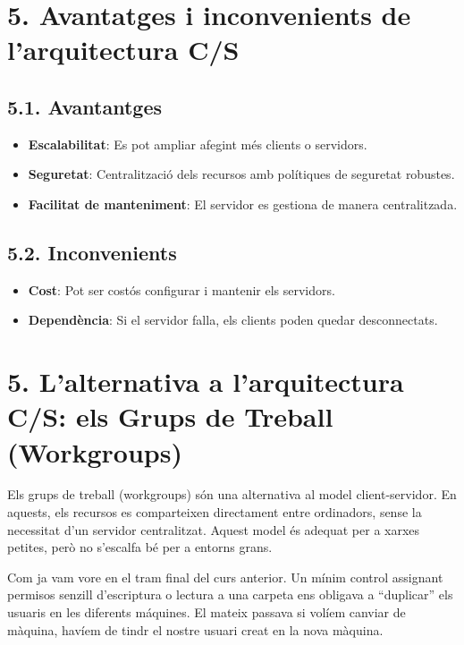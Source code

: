 \documentclass[
  a4paper,
]{article}
\providecommand{\tightlist}{%
  \setlength{\itemsep}{0pt}\setlength{\parskip}{0pt}}
\begin{document}
\section{5. Avantatges i inconvenients de l'arquitectura
C/S}\label{avantatges-i-inconvenients-de-larquitectura-cs}

\subsection{5.1. Avantantges}\label{avantantges}

\begin{itemize}
\tightlist
\item
  \textbf{Escalabilitat}: Es pot ampliar afegint més clients o
  servidors.
\item
  \textbf{Seguretat}: Centralització dels recursos amb polítiques de
  seguretat robustes.
\item
  \textbf{Facilitat de manteniment}: El servidor es gestiona de manera
  centralitzada.
\end{itemize}

\subsection{5.2. Inconvenients}\label{inconvenients}

\begin{itemize}
\tightlist
\item
  \textbf{Cost}: Pot ser costós configurar i mantenir els servidors.
\item
  \textbf{Dependència}: Si el servidor falla, els clients poden quedar
  desconnectats.
\end{itemize}

\section{5. L'alternativa a l'arquitectura C/S: els Grups de Treball
(Workgroups)}\label{lalternativa-a-larquitectura-cs-els-grups-de-treball-workgroups}

Els grups de treball (workgroups) són una alternativa al model
client-servidor. En aquests, els recursos es comparteixen directament
entre ordinadors, sense la necessitat d'un servidor centralitzat. Aquest
model és adequat per a xarxes petites, però no s'escalfa bé per a
entorns grans.

Com ja vam vore en el tram final del curs anterior. Un mínim control
assignant permisos senzill d'escriptura o lectura a una carpeta ens
obligava a ``duplicar'' els usuaris en les diferents máquines. El mateix
passava si volíem canviar de màquina, havíem de tindr el nostre usuari
creat en la nova màquina.
\end{document}

